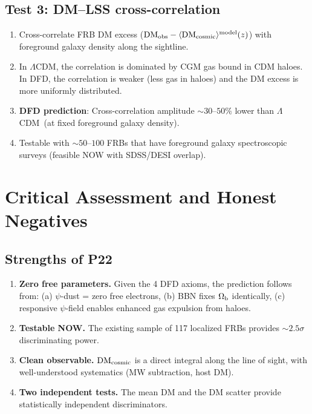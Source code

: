 \documentclass[11pt]{article}
\newcommand{\LCDM}{$\Lambda$CDM}
\newcommand{\Ob}{\Omega_{\rm b}}
\newcommand{\DMcosmic}{\langle\mathrm{DM}_{\rm cosmic}\rangle}
\begin{document}
\subsection{Test 3: DM--LSS cross-correlation}

\begin{enumerate}
\item Cross-correlate FRB DM excess ($\mathrm{DM}_{\rm obs} -
  \DMcosmic^{\rm model}(z)$) with foreground galaxy density along
  the sightline.
\item In \LCDM, the correlation is dominated by CGM gas bound in
  CDM haloes.  In DFD, the correlation is weaker (less gas in haloes)
  and the DM excess is more uniformly distributed.
\item \textbf{DFD prediction}: Cross-correlation amplitude
  $\sim 30$--$50\%$ lower than \LCDM\ (at fixed foreground galaxy
  density).
\item Testable with $\sim 50$--$100$ FRBs that have foreground
  galaxy spectroscopic surveys (feasible NOW with SDSS/DESI overlap).
\end{enumerate}

\section{Critical Assessment and Honest Negatives}
\label{sec:assessment}

\subsection{Strengths of P22}

\begin{enumerate}
\item \textbf{Zero free parameters.}  Given the 4 DFD axioms, the
  prediction follows from: (a) $\psi$-dust = zero free electrons,
  (b) BBN fixes $\Ob$ identically, (c) responsive $\psi$-field
  enables enhanced gas expulsion from haloes.

\item \textbf{Testable NOW.}  The existing sample of 117 localized
  FRBs provides $\sim 2.5\sigma$ discriminating power.

\item \textbf{Clean observable.}  $\mathrm{DM}_{\rm cosmic}$ is a
  direct integral along the line of sight, with well-understood
  systematics (MW subtraction, host DM).

\item \textbf{Two independent tests.}  The mean DM and the DM
  scatter provide statistically independent discriminators.
\end{enumerate}
\end{document}
